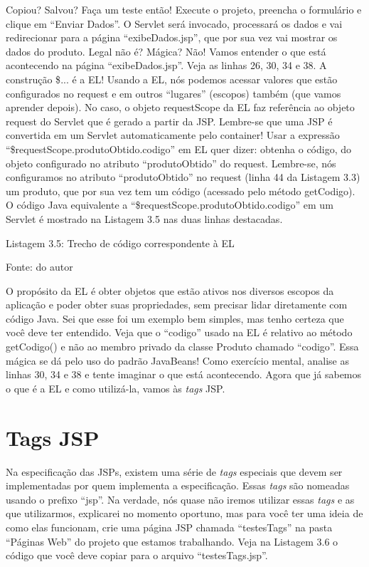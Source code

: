 Copiou? Salvou? Faça um teste então! Execute o projeto, preencha o formulário e clique em ``Enviar Dados''. O Servlet será invocado, processará os dados e vai redirecionar para a página ``exibeDados.jsp'', que por sua vez vai mostrar os dados do produto. Legal não é? Mágica? Não! Vamos entender o que está acontecendo na página ``exibeDados.jsp''. Veja as linhas 26, 30, 34 e 38. A construção \${...} é a EL! Usando a EL, nós podemos acessar valores que estão configurados no request e em outros ``lugares'' (escopos) também (que vamos aprender depois). No caso, o objeto requestScope da EL faz referência ao objeto request do Servlet que é gerado a partir da JSP. Lembre-se que uma JSP é convertida em um Servlet automaticamente pelo container!
Usar a expressão ``\${requestScope.produtoObtido.codigo}'' em EL quer dizer: obtenha o código, do objeto configurado no atributo ``produtoObtido'' do request. Lembre-se, nós configuramos no atributo ``produtoObtido'' no request (linha 44 da Listagem 3.3) um produto, que por sua vez tem um código (acessado pelo método getCodigo). O código Java equivalente a ``\${requestScope.produtoObtido.codigo}'' em um Servlet é mostrado na Listagem 3.5 nas duas linhas destacadas.

Listagem 3.5: Trecho de código correspondente à EL
 
Fonte: do autor

O propósito da EL é obter objetos que estão ativos nos diversos escopos da aplicação e poder obter suas propriedades, sem precisar lidar diretamente com código Java. Sei que esse foi um exemplo bem simples, mas tenho certeza que você deve ter entendido. Veja que o ``codigo'' usado na EL é relativo ao método getCodigo() e não ao membro privado da classe Produto chamado ``codigo''. Essa mágica se dá pelo uso do padrão JavaBeans! Como exercício mental, analise as linhas 30, 34 e 38 e tente imaginar o que está acontecendo. Agora que já sabemos o que é a EL e como utilizá-la, vamos às \textit{tags} JSP.


\section{Tags JSP}

Na especificação das JSPs, existem uma série de \textit{tags} especiais que devem ser implementadas por quem implementa a especificação. Essas \textit{tags} são nomeadas usando o prefixo ``jsp''. Na verdade, nós quase não iremos utilizar essas \textit{tags} e as que utilizarmos, explicarei no momento oportuno, mas para você ter uma ideia de como elas funcionam, crie uma página JSP chamada ``testesTags'' na pasta ``Páginas Web'' do projeto que estamos trabalhando. Veja na Listagem 3.6 o código que você deve copiar para o arquivo ``testesTags.jsp''. 

